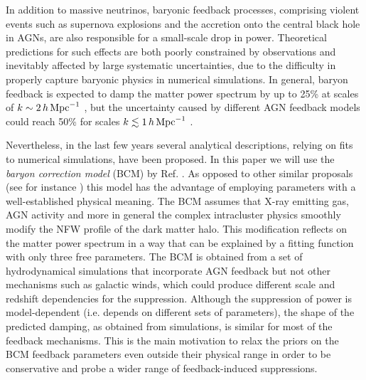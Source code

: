\documentclass[a4paper,11pt]{article}
\def\kMpc{\, h \, {\rm Mpc}^{-1}}
\begin{document}
{In addition to massive neutrinos, baryonic feedback processes, comprising violent events such as supernova explosions and the accretion onto the central black hole in AGNs, are also  responsible for a small-scale drop in power. Theoretical predictions for such effects are both poorly constrained by observations and inevitably affected by large systematic uncertainties, due to the difficulty in properly capture baryonic physics in numerical simulations.
In general, baryon feedback is expected to damp the matter power spectrum by up to 25\% at scales of $k\sim 2 \kMpc$ \cite{Schneider+15}, but the uncertainty caused by different AGN feedback models could reach 50\% for scales $k\lesssim 1 \kMpc$ \cite{HD_feedback+15}.

Nevertheless, in the last few years several analytical descriptions, relying on fits to numerical simulations, have been proposed.
In this paper we will use the \textit{baryon correction model} (BCM) by Ref. \cite{Schneider+15}.
As opposed to other similar proposals (see for instance \cite{HD_feedback+15, Chisari-feedback+18}) this model has the advantage of employing parameters with a well-established physical meaning.
The BCM assumes that X-ray emitting gas, AGN activity and more in general the complex intracluster physics smoothly modify the NFW profile of the dark matter halo.
This modification reflects on the matter power spectrum in a way that can be explained by a fitting function with only three free parameters.
The BCM is obtained from a set of hydrodynamical simulations that incorporate AGN feedback but not other mechanisms such as galactic winds, which could produce different scale and redshift dependencies for the suppression.
Although the suppression of power is model-dependent (i.e. depends on different sets of parameters), the shape of the predicted damping, as obtained from simulations, is similar for most of the feedback mechanisms. 
This is the main motivation to relax the priors on the BCM feedback parameters even outside their physical range in order to be conservative and probe a wider range of feedback-induced suppressions.

}
\end{document}
